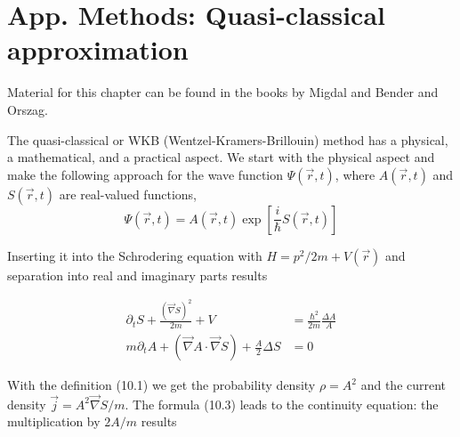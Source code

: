 \chapter{App. Methods: Quasi-classical approximation}
Material for this chapter can be found in the books by Migdal and Bender and Orszag.\par
The quasi-classical or WKB (Wentzel-Kramers-Brillouin) method has a physical, a mathematical, and a practical aspect. We start with the physical aspect and make the following approach for the wave function $\Psi(\vec{r},t)$, where $A(\vec{r},t)$ and $S(\vec{r},t)$ are real-valued functions,
\begin{equation}
    \Psi(\vec{r}, t)=A(\vec{r}, t) \exp \left[\frac{i}{\hbar} S(\vec{r}, t)\right]
\end{equation}

Inserting it into the Schrodering equation with $H = p^2 / 2m + V (\vec{r})$ and separation into real and imaginary parts results

\begin{align} \partial_{t} S+\frac{(\vec{\nabla} S)^{2}}{2 m}+V &=\frac{\hbar^{2}}{2 m} \frac{\Delta A}{A} \\ m \partial_{t} A+(\vec{\nabla} A \cdot \vec{\nabla} S)+\frac{A}{2} \Delta S &=0 \end{align}

With the definition (10.1) we get the probability density $\rho=A^2$ and the current density $\vec{j}=A^2\vec{\nabla}S/m$. The formula (10.3) leads to the continuity equation: the multiplication by $2A / m$ results

